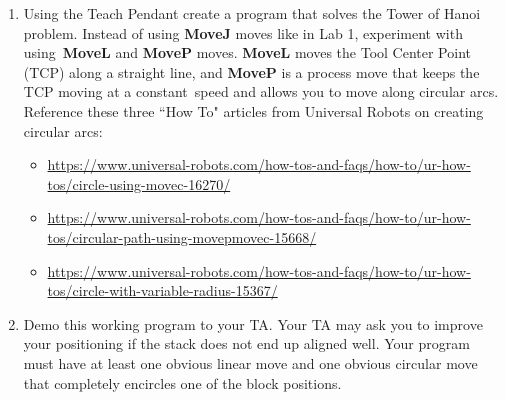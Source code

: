 \begin{enumerate}
\item Using the Teach Pendant create a program that solves the Tower of Hanoi problem.  Instead of using \textbf{MoveJ} moves like in Lab 1, experiment with using\
\textbf{MoveL} and \textbf{MoveP} moves.  \textbf{MoveL} moves the Tool Center Point (TCP) along a straight line, and \textbf{MoveP} is a process move that keeps the TCP moving at a constant\
speed and allows you to move along circular arcs.  Reference these three ``How To" articles from Universal Robots on creating circular arcs:
\begin {itemize}
\item \url{https://www.universal-robots.com/how-tos-and-faqs/how-to/ur-how-tos/circle-using-movec-16270/}
\item \url{https://www.universal-robots.com/how-tos-and-faqs/how-to/ur-how-tos/circular-path-using-movepmovec-15668/}
\item \url{https://www.universal-robots.com/how-tos-and-faqs/how-to/ur-how-tos/circle-with-variable-radius-15367/}
\end {itemize}
\item Demo this working program to your TA.  Your TA may ask you to improve your positioning if the stack does not end up aligned well.
Your program must have at least one obvious linear move and one obvious circular move that completely encircles one of the block positions.
\end{enumerate}

